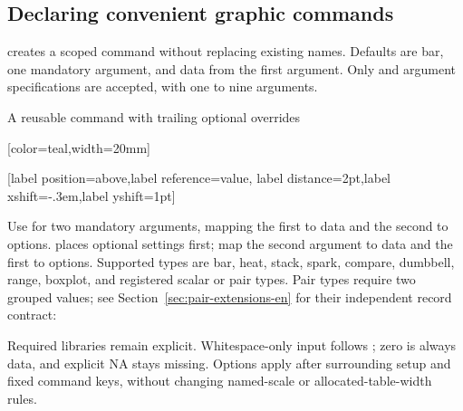 \subsection{Declaring convenient graphic commands}
 creates a scoped
command without replacing existing names. Defaults are bar, one mandatory argument,
and data from the first argument. Only  and  argument specifications are
accepted, with one to nine arguments.
\begin{demo}{A reusable command with trailing optional overrides}
\begingroup
\gradbarsnewcommand[type=bar,args={m O{}},data={#1},options={#2},
 empty=skip,theme=gray,min=0,max=1,width=12mm,height=5pt,
 precision=3,label position=right,label distance=1mm]{\servicebar}
\par\medskip
{}[color=teal,width=20mm]\par\medskip
{}[label position=above,label reference=value,
 label distance=2pt,label xshift=-.3em,label yshift=1pt]
\endgroup
\end{demo}
Use  for two mandatory arguments, mapping the first to data
and the second to options.  places optional settings first;
map the second argument to data and the first to options.
Supported types are bar, heat, stack, spark, compare, dumbbell, range, boxplot,
and registered scalar or pair types. Pair types require two grouped values;
see Section~\ref{sec:pair-extensions-en} for their independent record contract:
\begin{source}
\gradbarsnewcommand[type=dumbbell,args={m m},
  data={{#1}{#2}}]{\pairbar}
\end{source}
Required libraries remain explicit.
Whitespace-only input follows ; zero is always data,
and explicit NA stays missing. Options apply after surrounding setup and fixed
command keys, without changing named-scale or allocated-table-width rules.

